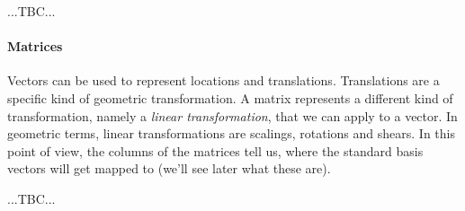 

...TBC...






\paragraph{Matrices}
Vectors can be used to represent locations and translations. Translations are a specific kind of geometric transformation. A matrix represents a different kind of transformation, namely a \emph{linear transformation}, that we can apply to a vector. In geometric terms, linear transformations are scalings, rotations and shears. In this point of view, the columns of the matrices tell us, where the standard basis vectors will get mapped to (we'll see later what these are).

...TBC...




